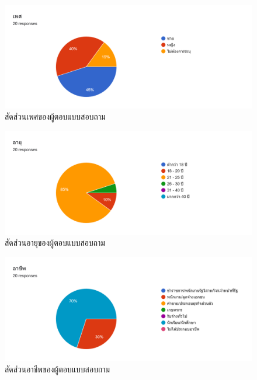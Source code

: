 \documentclass[12pt,oneside,openright,a4paper]{cpe-thai-project}
\begin{document}
 \\
\begin{figure}[!ht]\centering
  \includegraphics[width=\textwidth]{./img/test/gender.png}
  \caption{สัดส่วนเพศของผู้ตอบแบบสอบถาม}\label{fig:user_test_gender}
\end{figure}
\begin{figure}[!ht]\centering
  \includegraphics[width=\textwidth]{./img/test/age.png}
  \caption{สัดส่วนอายุของผู้ตอบแบบสอบถาม}\label{fig:user_test_age}
\end{figure}

\newpage
\begin{figure}[!ht]\centering
  \includegraphics[width=\textwidth]{./img/test/job.png}
  \caption{สัดส่วนอาชีพของผู้ตอบแบบสอบถาม}\label{fig:user_test_job}
\end{figure}
\end{document}
